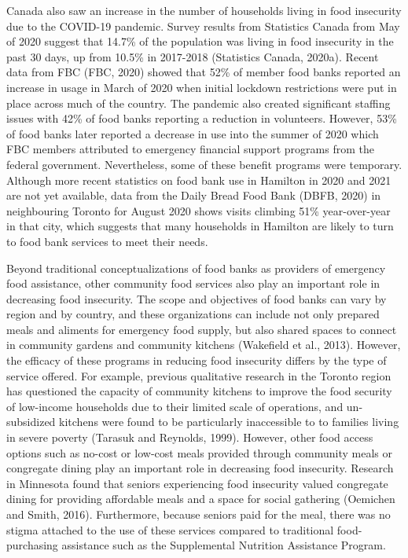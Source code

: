 \documentclass[]{elsarticle} %
\begin{document}
Canada also saw an increase in the number of households living in food
insecurity due to the COVID-19 pandemic. Survey results from Statistics
Canada from May of 2020 suggest that 14.7\% of the population was living
in food insecurity in the past 30 days, up from 10.5\% in 2017-2018
(Statistics Canada, 2020a). Recent data from FBC (FBC, 2020) showed that
52\% of member food banks reported an increase in usage in March of 2020
when initial lockdown restrictions were put in place across much of the
country. The pandemic also created significant staffing issues with 42\%
of food banks reporting a reduction in volunteers. However, 53\% of food
banks later reported a decrease in use into the summer of 2020 which FBC
members attributed to emergency financial support programs from the
federal government. Nevertheless, some of these benefit programs were
temporary. Although more recent statistics on food bank use in Hamilton
in 2020 and 2021 are not yet available, data from the Daily Bread Food
Bank (DBFB, 2020) in neighbouring Toronto for August 2020 shows visits
climbing 51\% year-over-year in that city, which suggests that many
households in Hamilton are likely to turn to food bank services to meet
their needs.

Beyond traditional conceptualizations of food banks as providers of
emergency food assistance, other community food services also play an
important role in decreasing food insecurity. The scope and objectives
of food banks can vary by region and by country, and these organizations
can include not only prepared meals and aliments for emergency food
supply, but also shared spaces to connect in community gardens and
community kitchens (Wakefield et al., 2013). However, the efficacy of
these programs in reducing food insecurity differs by the type of
service offered. For example, previous qualitative research in the
Toronto region has questioned the capacity of community kitchens to
improve the food security of low-income households due to their limited
scale of operations, and un-subsidized kitchens were found to be
particularly inaccessible to to families living in severe poverty
(Tarasuk and Reynolds, 1999). However, other food access options such as
no-cost or low-cost meals provided through community meals or congregate
dining play an important role in decreasing food insecurity. Research in
Minnesota found that seniors experiencing food insecurity valued
congregate dining for providing affordable meals and a space for social
gathering (Oemichen and Smith, 2016). Furthermore, because seniors paid
for the meal, there was no stigma attached to the use of these services
compared to traditional food-purchasing assistance such as the
Supplemental Nutrition Assistance Program.
\end{document}
